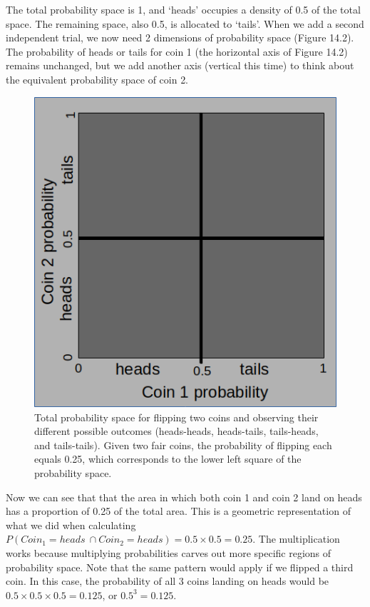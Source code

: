 \documentclass[
]{scrbook}
\begin{document}
The total probability space is 1, and `heads' occupies a density of 0.5 of the total space.
The remaining space, also 0.5, is allocated to `tails'.
When we add a second independent trial, we now need 2 dimensions of probability space (Figure 14.2).
The probability of heads or tails for coin 1 (the horizontal axis of Figure 14.2) remains unchanged, but we add another axis (vertical this time) to think about the equivalent probability space of coin 2.

\begin{figure}
\includegraphics[width=1\linewidth]{img/coin2_probability} \caption{Total probability space for flipping two coins and observing their different possible outcomes (heads-heads, heads-tails, tails-heads, and tails-tails). Given two fair coins, the probability of flipping each equals 0.25, which corresponds to the lower left square of the probability space.}\label{fig:unnamed-chunk-54}
\end{figure}

Now we can see that that the area in which both coin 1 and coin 2 land on heads has a proportion of 0.25 of the total area.
This is a geometric representation of what we did when calculating \(P(Coin_{1} = heads\:\cap Coin_{2} = heads) = 0.5 \times 0.5 = 0.25.\)
The multiplication works because multiplying probabilities carves out more specific regions of probability space.
Note that the same pattern would apply if we flipped a third coin.
In this case, the probability of all 3 coins landing on heads would be \(0.5 \times 0.5 \times 0.5 = 0.125\), or \(0.5^{3} = 0.125\).
\end{document}
